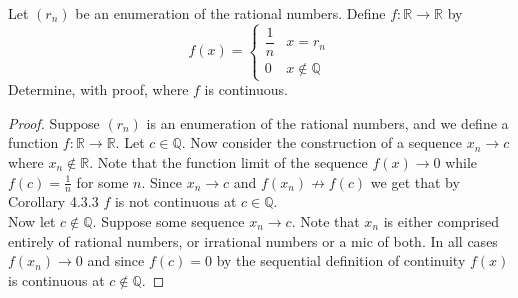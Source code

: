 \documentclass[12pt]{article}
\makeatletter
\theoremstyle{homework}
\newenvironment{exercise}[1]
{\def\@currentlabel{#1}\exercisecore}
{\endexercisecore}
\newcommand{\Reals}{\ensuremath{\mathbb R}}
\newcommand{\Rats}{\ensuremath{\mathbb Q}}
\makeatother
\begin{document}
\begin{exercise}{7} Let $(r_n)$ be an enumeration of the rational numbers. Define $f: \Reals \to \Reals$ by 
  \begin{equation*}
    f(x) = 
    \begin{cases} 
      \dfrac{1}{n} & x = r_n \\
      0 & x \not\in \Rats 
   \end{cases}
  \end{equation*}
  Determine, with proof, where $f$ is continuous.\\
  
\begin{proof}
  Suppose $(r_n)$ is an enumeration of the rational numbers, and we define a function $f: \Reals \to \Reals$. 
  Let $c \in \Rats$. Now consider the construction of a sequence $x_n \to c$ where $x_n \not\in \Reals$. Note that the function limit
  of the sequence $f(x) \to 0$ while $f(c) = \frac{1}{n}$ for some $n$. Since $x_n \to c$ and $f(x_n) \not\to f(c)$ we get that by Corollary 4.3.3
  $f$ is not continuous at $c \in \Rats$. \\

  Now let $c \not\in \Rats$. Suppose some sequence $x_n \to c$. Note that $x_n$ is either comprised entirely of rational numbers, or irrational numbers or a mic of both.
  In all cases $f(x_n) \to 0$ and since $f(c) = 0$ by the sequential definition of continuity $f(x)$ is continuous at $c \not\in \Rats$.


\end{proof}






\end{exercise}
\vspace{.5in}
\end{document}
